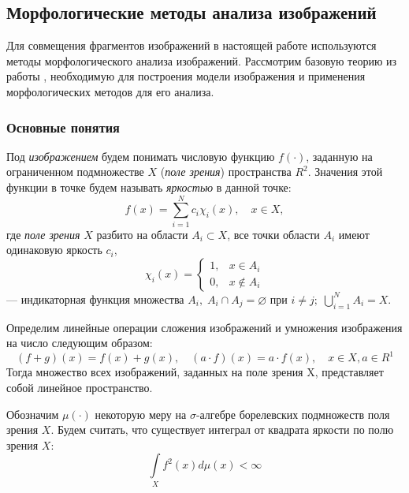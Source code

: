 \subsection{Морфологические методы анализа изображений}\label{morphology}
Для совмещения фрагментов изображений в настоящей работе используются методы морфологического анализа изображений. Рассмотрим базовую теорию из работы \cite{book:morpho}, необходимую для построения модели изображения и применения морфологических методов для его анализа.

\subsubsection{Основные понятия}\label{morph_basic}

Под \emph{изображением} будем понимать числовую функцию $f(\cdot)$, заданную на ограниченном подмножестве $X$ (\emph{поле зрения}) пространства $R^2$. Значения этой функции в точке будем называть \emph{яркостью} в данной точке:
\begin{equation*}
    f(x) = \sum\limits_{i=1}^N c_i\chi_i (x),\quad x \in X ,
\end{equation*}
где \emph{поле зрения} $X$ разбито на области $A_i \subset X$, все точки области $A_i$ имеют одинаковую яркость $c_i$,
\begin{equation*}
    \chi_i(x) =
        \begin{cases}
            1, & x \in A_i\\
            0, & x \notin A_i
        \end{cases}
\end{equation*}
--- индикаторная функция множества $A_i, \; A_i \cap A_j = \varnothing$ при $i \neq j; \; \bigcup_{i=1}^N A_i = X$.


Определим линейные операции сложения изображений и умножения изображения на число следующим образом:
\begin{equation*}
    (f + g)(x) = f(x) + g(x), \quad (a \cdot f)(x) = a \cdot f(x), \quad x \in X, a \in R^1
\end{equation*}
Тогда множество всех изображений, заданных на поле зрения X, представляет собой линейное пространство.


Обозначим $\mu(\cdot)$ некоторую меру на $\sigma$-алгебре борелевских подмножеств поля зрения $X$. Будем считать, что существует интеграл от квадрата яркости по полю зрения $X$:
\begin{equation}\label{eq:intfnotinf}
    \int\limits_X f^2(x)d\mu(x) < \infty
\end{equation}


